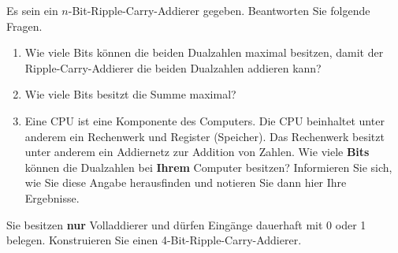 \newpage

\begin{exercise}
Es sein ein $n$-Bit-Ripple-Carry-Addierer gegeben. Beantworten Sie folgende Fragen.
\begin{enumerate}
\item Wie viele Bits können die beiden Dualzahlen maximal besitzen, damit der Ripple-Carry-Addierer die beiden Dualzahlen addieren kann?

\fillwithgrid	{1in}

\item Wie viele Bits besitzt die Summe maximal?

\fillwithgrid	{1in}

\item Eine \ac{CPU} ist eine Komponente des Computers. Die \ac{CPU} beinhaltet unter anderem ein Rechenwerk und Register (Speicher). Das Rechenwerk besitzt unter anderem ein Addiernetz zur Addition von Zahlen. Wie viele \textbf{Bits} können die Dualzahlen bei \textbf{Ihrem} Computer besitzen? Informieren Sie sich, wie Sie diese Angabe herausfinden und notieren Sie dann hier Ihre Ergebnisse.

\fillwithgrid	{1.5in}

\end{enumerate}
\end{exercise}

\begin{exercise}
Sie besitzen \textbf{nur} Volladdierer und dürfen Eingänge dauerhaft mit \num{0} oder \num{1} belegen. Konstruieren Sie einen \num{4}-Bit-Ripple-Carry-Addierer.
\end{exercise}